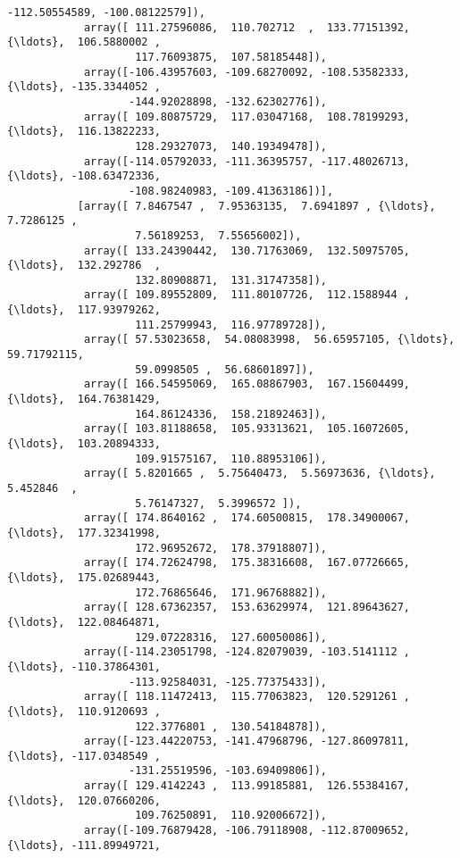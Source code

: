 \documentclass[11pt]{article}
\begin{document}
\begin{Verbatim}[commandchars=\\\{\}]
                   -112.50554589, -100.08122579]),
            array([ 111.27596086,  110.702712  ,  133.77151392, {\ldots},  106.5880002 ,
                    117.76093875,  107.58185448]),
            array([-106.43957603, -109.68270092, -108.53582333, {\ldots}, -135.3344052 ,
                   -144.92028898, -132.62302776]),
            array([ 109.80875729,  117.03047168,  108.78199293, {\ldots},  116.13822233,
                    128.29327073,  140.19349478]),
            array([-114.05792033, -111.36395757, -117.48026713, {\ldots}, -108.63472336,
                   -108.98240983, -109.41363186])],
           [array([ 7.8467547 ,  7.95363135,  7.6941897 , {\ldots},  7.7286125 ,
                    7.56189253,  7.55656002]),
            array([ 133.24390442,  130.71763069,  132.50975705, {\ldots},  132.292786  ,
                    132.80908871,  131.31747358]),
            array([ 109.89552809,  111.80107726,  112.1588944 , {\ldots},  117.93979262,
                    111.25799943,  116.97789728]),
            array([ 57.53023658,  54.08083998,  56.65957105, {\ldots},  59.71792115,
                    59.0998505 ,  56.68601897]),
            array([ 166.54595069,  165.08867903,  167.15604499, {\ldots},  164.76381429,
                    164.86124336,  158.21892463]),
            array([ 103.81188658,  105.93313621,  105.16072605, {\ldots},  103.20894333,
                    109.91575167,  110.88953106]),
            array([ 5.8201665 ,  5.75640473,  5.56973636, {\ldots},  5.452846  ,
                    5.76147327,  5.3996572 ]),
            array([ 174.8640162 ,  174.60500815,  178.34900067, {\ldots},  177.32341998,
                    172.96952672,  178.37918807]),
            array([ 174.72624798,  175.38316608,  167.07726665, {\ldots},  175.02689443,
                    172.76865646,  171.96768882]),
            array([ 128.67362357,  153.63629974,  121.89643627, {\ldots},  122.08464871,
                    129.07228316,  127.60050086]),
            array([-114.23051798, -124.82079039, -103.5141112 , {\ldots}, -110.37864301,
                   -113.92584031, -125.77375433]),
            array([ 118.11472413,  115.77063823,  120.5291261 , {\ldots},  110.9120693 ,
                    122.3776801 ,  130.54184878]),
            array([-123.44220753, -141.47968796, -127.86097811, {\ldots}, -117.0348549 ,
                   -131.25519596, -103.69409806]),
            array([ 129.4142243 ,  113.99185881,  126.55384167, {\ldots},  120.07660206,
                    109.76250891,  110.92006672]),
            array([-109.76879428, -106.79118908, -112.87009652, {\ldots}, -111.89949721,

\end{Verbatim}
\end{document}
